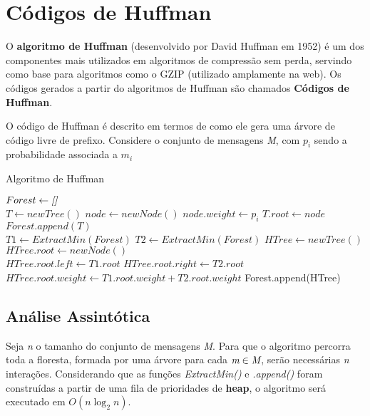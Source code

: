 \section{Códigos de Huffman}
O \textbf{algoritmo de Huffman} (desenvolvido por David Huffman em 1952) é um dos componentes mais utilizados em algoritmos de compressão sem perda, servindo como base para algoritmos como o GZIP (utilizado amplamente na web).
Os códigos gerados a partir do algoritmos de Huffman são chamados \textbf{Códigos de Huffman}.

O código de Huffman é descrito em termos de como ele gera uma árvore de código livre de prefixo. Considere o conjunto de mensagens \emph{M}, com $p_i$ sendo a probabilidade associada a $m_i$

\begin{algorithm}[H]
\caption{Algoritmo de Huffman} \label{alg:huff}
\begin{algorithmic}
	\State $Forest \gets \emph{[]}$\\
	 
		\State $T \gets newTree()$
		\State $node \gets newNode()$
		\State $node.weight \gets p_i$ 
		\State $T.root \gets node$
		\State $Forest.append(T)$ 
	\EndFor \\
	
		\State $T1 \gets ExtractMin(Forest)$ 
		\State $T2 \gets ExtractMin(Forest)$
		\State $HTree \gets newTree()$
		\State $HTree.root \gets newNode()$ \\
		\State $HTree.root.left \gets T1.root$
		\State $HTree.root.right \gets T2.root$
		\State $HTree.root.weight \gets T1.root.weight + T2.root.weight$
		\State Forest.append(HTree) 
	\EndWhile
\end{algorithmic}
\end{algorithm}

\subsection{Análise Assintótica}
Seja \emph{n} o tamanho do conjunto de mensagens \emph{M}. Para que o algoritmo percorra toda a floresta, formada por uma árvore para cada $\emph{m} \in \emph{M}$, serão necessárias \emph{n} interações.
Considerando que as funções \emph{ExtractMin()} e \emph{.append()} foram construídas a partir de uma fila de prioridades de \textbf{heap}, o algoritmo será executado em  $O(n \log_2 n)$.

